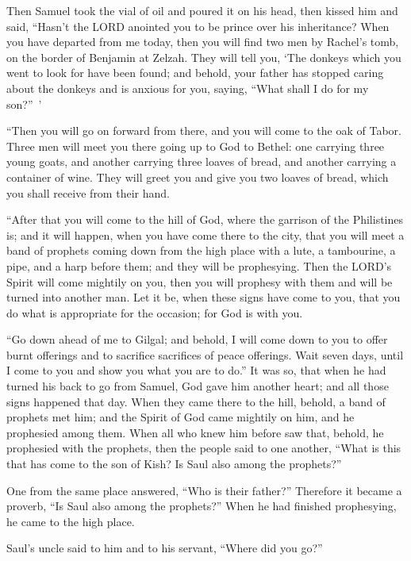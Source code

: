 \mychapter{} \myverse*{}Then Samuel took the vial of oil and poured it on his head, then
kissed him and said, “Hasn’t the LORD anointed you to be prince over his inheritance?
\myverse{}When you have departed from me today, then you will find two men by Rachel’s
tomb, on the border of Benjamin at Zelzah. They will tell you, ‘The donkeys which you went to look for
have been found; and behold, your father has stopped caring about the donkeys and is anxious for you,
saying, “What shall I do for my son?” ’

\myverse{}“Then you will go on forward from there, and you will come to
the oak of Tabor. Three men will meet you there going up to God to Bethel: one carrying three young goats,
and another carrying three loaves of bread, and another carrying a container of wine.
\myverse{}They will greet you and give you two loaves of bread, which you shall receive
from their hand.

\myverse{}“After that you will come to the hill of God, where the garrison
of the Philistines is; and it will happen, when you have come there to the city, that you will meet a
band of prophets coming down from the high place with a lute, a tambourine, a pipe, and a harp before
them; and they will be prophesying.
\myverse{}Then the LORD’s Spirit will come mightily on you, then you will prophesy with
them and will be turned into another man.
\myverse{}Let it be, when these signs have come to you, that you do what is appropriate
for the occasion; for God is with you.

\myverse{}“Go down ahead of me to Gilgal; and behold, I will come down to
you to offer burnt offerings and to sacrifice sacrifices of peace offerings. Wait seven days, until I
come to you and show you what you are to do.”
\myverse{}It was so, that when he had turned his back to go from Samuel, God gave him
another heart; and all those signs happened that day.
\myverse{}When they came there to the hill, behold, a band of prophets met him; and
the Spirit of God came mightily on him, and he prophesied among them.
\myverse{}When all who knew him before saw that, behold, he prophesied with the prophets,
then the people said to one another, “What is this that has come to the son of Kish? Is Saul also among
the prophets?”

\myverse{}One from the same place answered, “Who is their father?” Therefore
it became a proverb, “Is Saul also among the prophets?”
\myverse{}When he had finished prophesying, he came to the high place.

\myverse{}Saul’s uncle said to him and to his servant, “Where did you
go?”

